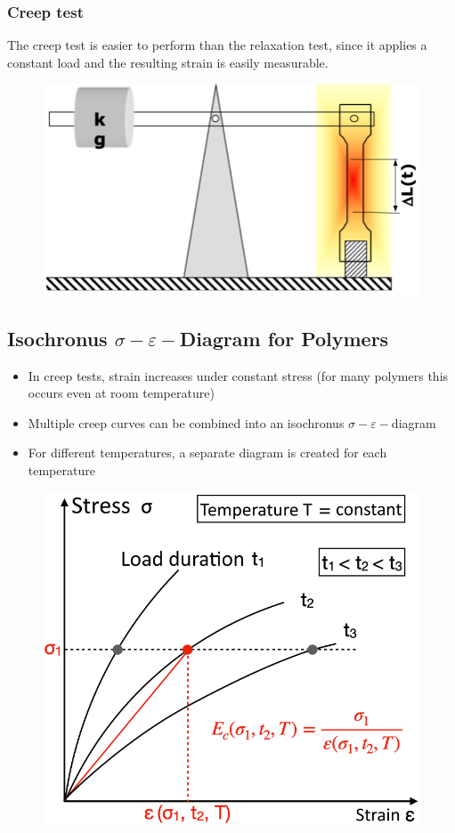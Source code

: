 \documentclass{article}
\begin{document}
\subsubsection{Creep test}
The creep test is easier to perform than the relaxation test, since it applies a constant
load and the resulting strain is easily measurable.
\begin{figure}[ht!]
  \centering
  \includegraphics[width=.5\textwidth]{media/creep-test.png}
\end{figure}

\subsection{Isochronus $\sigma-\varepsilon-$Diagram for Polymers}
\begin{itemize}
  \item In creep tests, strain increases under constant stress (for many polymers this occurs even at room temperature)
  \item Multiple creep curves can be combined into an isochronus $\sigma-\varepsilon-$diagram
  \item For different temperatures, a separate diagram is created for each temperature
\end{itemize}

\begin{figure}[ht!]
  \centering
  \includegraphics[width=.45\textwidth]{media/isochronus-diagram.png}
\end{figure}

\end{document}
